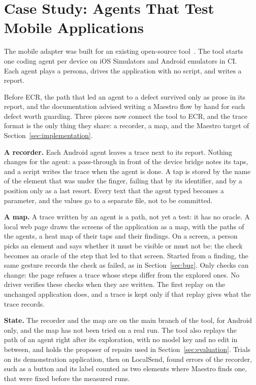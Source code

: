 \section{Case Study: Agents That Test Mobile Applications}
\label{sec:case}

The mobile adapter was built for an existing open-source tool\matnamed~\matcite. The tool starts one coding agent per device on iOS Simulators and Android emulators in CI. Each agent plays a persona, drives the application with no script, and writes a report.

Before ECR, the path that led an agent to a defect survived only as prose in its report, and the documentation advised writing a Maestro flow by hand for each defect worth guarding. Three pieces now connect the tool to ECR, and the trace format is the only thing they share: a recorder, a map, and the Maestro target of Section~\ref{sec:implementation}.

\textbf{A recorder.} Each Android agent leaves a trace next to its report. Nothing changes for the agent: a pass-through in front of the device bridge notes its taps, and a script writes the trace when the agent is done. A tap is stored by the name of the element that was under the finger, failing that by its identifier, and by a position only as a last resort. Every text that the agent typed becomes a parameter, and the values go to a separate file, not to be committed.

\textbf{A map.} A trace written by an agent is a path, not yet a test: it has no oracle. A local web page draws the screens of the application as a map, with the paths of the agents, a heat map of their taps and their findings. On a screen, a person picks an element and says whether it must be visible or must not be: the check becomes an oracle of the step that led to that screen. Started from a finding, the same gesture records the check as failed, as in Section~\ref{sec:bug}. Only checks can change: the page refuses a trace whose steps differ from the explored ones. No driver verifies these checks when they are written. The first replay on the unchanged application does, and a trace is kept only if that replay gives what the trace records.

\textbf{State.} The recorder and the map are on the main branch of the tool, for Android only, and the map has not been tried on a real run. The tool also replays the path of an agent right after its exploration, with no model key and no edit in between, and holds the proposer of repairs used in Section~\ref{sec:evaluation}. Trials on its demonstration application, then on LocalSend, found errors of the recorder, such as a button and its label counted as two elements where Maestro finds one, that were fixed before the measured runs.
